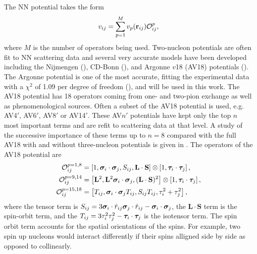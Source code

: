 The NN potential takes the form
\begin{equation}
   v_{ij} = \sum\limits_{p=1}^M v_p(\mathbf{r}_{ij})\mathcal{O}^p_{ij},
\end{equation}
where $M$ is the number of operators being used.
Two-nucleon potentials are often fit to NN scattering data and several very accurate models have been developed including the Nijmengen (\cite{nagels1975,stoks1994}), CD-Bonn (\cite{machleidt1996,machleidt2001}), and Argonne $v$18 (AV18) potentials (\cite{wiringa1984,wiringa1995}). The Argonne potential is one of the most accurate, fitting the experimental data with a $\chi^2$ of 1.09 per degree of freedom (\cite{wiringa1995}), and will be used in this work. The AV18 potential has 18 operators coming from one- and two-pion exchange as well as phenomenological sources. Often a subset of the AV18 potential is used, e.g. AV4$'$, AV6$'$, AV8$'$ or AV14$'$. These AV$n'$ potentials have kept only the top $n$ most important terms and are refit to scattering data at that level. A study of the successive importance of these terms up to $n=8$ compared with the full AV18 with and without three-nucleon potentials is given in \cite{wiringa2002}. The operators of the AV18 potential are
\begin{align}
   \mathcal{O}_{ij}^{p=1,8} &= \left[1,\bm{\sigma}_i\cdot\bm{\sigma}_j,S_{ij},\mathbf{L}\cdot\mathbf{S}\right]\otimes\left[1,\bm{\tau}_i\cdot\bm{\tau}_j\right], \\
   \mathcal{O}_{ij}^{p=9,14} &= \left[\mathbf{L}^2,\mathbf{L}^2\bm{\sigma}_i\cdot\bm{\sigma}_j,(\mathbf{L}\cdot\mathbf{S})^2\right]\otimes\left[1,\bm{\tau}_i\cdot\bm{\tau}_j\right], \\
   \mathcal{O}_{ij}^{p=15,18} &= \left[T_{ij},\bm{\sigma}_i\cdot\bm{\sigma}_j T_{ij},S_{ij}T_{ij},\tau_i^2+\tau_j^2\right],
\end{align}
where the tensor term is $S_{ij} = 3\bm{\sigma}_i\cdot\hat{r}_{ij}\bm{\sigma}_j\cdot\hat{r}_{ij}-\bm{\sigma}_i\cdot\bm{\sigma}_j$, the $\mathbf{L}\cdot\mathbf{S}$ term is the spin-orbit term, and the $T_{ij} = 3\tau_i^2\tau_j^2-\bm{\tau}_i\cdot\bm{\tau}_j$ is the isotensor term. The spin orbit term accounts for the spatial orientations of the spins. For example, two spin up nucleons would interact differently if their spins alligned side by side as opposed to collinearly.


